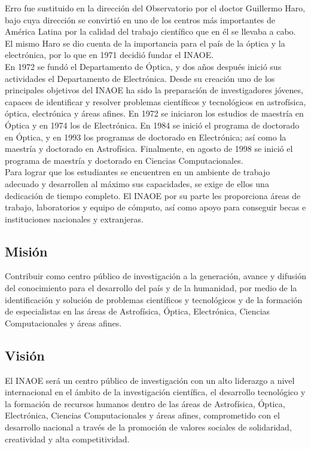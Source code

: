 Erro fue sustituido en la dirección del Observatorio por el doctor Guillermo Haro, bajo cuya dirección se convirtió en uno de los centros más importantes de América Latina por la calidad del trabajo científico que en él se llevaba a cabo. El mismo Haro se dio cuenta de la importancia para el país de la óptica y la electrónica, por lo que en 1971 decidió fundar el INAOE.
\\
 
En 1972 se fundó el Departamento de Óptica, y dos años después inició sus actividades el Departamento de Electrónica. Desde su creación uno de los principales objetivos del INAOE ha sido la preparación de investigadores jóvenes, capaces de identificar y resolver problemas científicos y tecnológicos en astrofísica, óptica, electrónica y áreas afines. En 1972 se iniciaron los estudios de maestría en Óptica y en 1974 los de Electrónica. En 1984 se inició el programa de doctorado en Óptica, y en 1993 los programas de doctorado en Electrónica; así como la maestría y doctorado en Astrofísica. Finalmente, en agosto de 1998 se inició el programa de maestría y doctorado en Ciencias Computacionales.
\\
  
Para lograr que los estudiantes se encuentren en un ambiente de trabajo adecuado y desarrollen al máximo sus capacidades, se exige de ellos una dedicación de tiempo completo. El INAOE por su parte les proporciona áreas de trabajo, laboratorios y equipo de cómputo, así como apoyo para conseguir becas e instituciones nacionales y extranjeras.

\subsection{Misión}
Contribuir como centro público de investigación a la generación, avance y difusión del conocimiento para el desarrollo del país y de la humanidad, por medio de la identificación y solución de problemas científicos y tecnológicos y de la formación de especialistas en las áreas de Astrofísica, Óptica, Electrónica, Ciencias Computacionales y áreas afines.
 
\subsection{Visión}
El INAOE será un centro público de investigación con un alto liderazgo a nivel internacional en el ámbito de la investigación científica, el desarrollo tecnológico y la formación de recursos humanos dentro de las áreas de Astrofísica, Óptica, Electrónica, Ciencias Computacionales y áreas afines, comprometido con el desarrollo nacional a través de la promoción de valores sociales de solidaridad, creatividad y alta competitividad.


